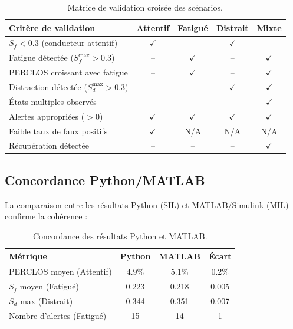 \begin{table}[H]
\centering
\caption{Matrice de validation croisée des scénarios.}
\label{tab:validation_croisee}
\renewcommand{\arraystretch}{1.3}
\begin{tabular}{|l|c|c|c|c|}
\hline
\rowcolor{stellantisblue!15}
\textbf{Critère de validation} & \textbf{Attentif} & \textbf{Fatigué} & \textbf{Distrait} & \textbf{Mixte} \\
\hline
$S_f < 0.3$ (conducteur attentif) & \cellcolor{green!20} $\checkmark$ & -- & \cellcolor{green!20} $\checkmark$ & -- \\
\hline
Fatigue détectée ($S_f^{\max} > 0.3$) & -- & \cellcolor{green!20} $\checkmark$ & -- & \cellcolor{green!20} $\checkmark$ \\
\hline
PERCLOS croissant avec fatigue & -- & \cellcolor{green!20} $\checkmark$ & -- & \cellcolor{green!20} $\checkmark$ \\
\hline
Distraction détectée ($S_d^{\max} > 0.3$) & -- & -- & \cellcolor{green!20} $\checkmark$ & \cellcolor{green!20} $\checkmark$ \\
\hline
États multiples observés & -- & -- & -- & \cellcolor{green!20} $\checkmark$ \\
\hline
Alertes appropriées ($> 0$) & \cellcolor{green!20} $\checkmark$ & \cellcolor{green!20} $\checkmark$ & \cellcolor{green!20} $\checkmark$ & \cellcolor{green!20} $\checkmark$ \\
\hline
Faible taux de faux positifs & \cellcolor{green!20} $\checkmark$ & N/A & N/A & N/A \\
\hline
Récupération détectée & -- & -- & -- & \cellcolor{green!20} $\checkmark$ \\
\hline
\end{tabular}
\end{table}

\subsection{Concordance Python/MATLAB}

La comparaison entre les résultats Python (SIL) et MATLAB/Simulink (MIL) confirme la cohérence :

\begin{table}[H]
\centering
\caption{Concordance des résultats Python et MATLAB.}
\label{tab:concordance}
\renewcommand{\arraystretch}{1.3}
\begin{tabular}{|l|c|c|c|}
\hline
\rowcolor{stellantisblue!15}
\textbf{Métrique} & \textbf{Python} & \textbf{MATLAB} & \textbf{Écart} \\
\hline
PERCLOS moyen (Attentif) & 4.9\% & 5.1\% & 0.2\% \\
\hline
$S_f$ moyen (Fatigué) & 0.223 & 0.218 & 0.005 \\
\hline
$S_d$ max (Distrait) & 0.344 & 0.351 & 0.007 \\
\hline
Nombre d'alertes (Fatigué) & 15 & 14 & 1 \\
\hline
\end{tabular}
\end{table}

